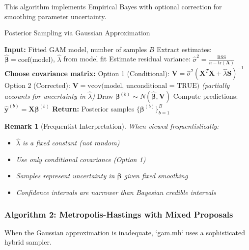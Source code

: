 \documentclass[12pt]{article}
\newtheorem{remark}{Remark}
\begin{document}
This algorithm implements Empirical Bayes with optional correction for smoothing parameter uncertainty.

\begin{algorithm}[H]
\caption{Posterior Sampling via Gaussian Approximation}
\begin{algorithmic}[1]
\State \textbf{Input:} Fitted GAM model, number of samples $B$
\State Extract estimates: $\hat{\boldsymbol{\beta}} = \text{coef(model)}$, $\hat{\lambda}$ from model fit
\State Estimate residual variance: $\hat{\sigma}^2 = \frac{\text{RSS}}{n - \text{tr}(\mathbf{A})}$
\State \textbf{Choose covariance matrix:}
\State \quad Option 1 (Conditional): $\mathbf{V} = \hat{\sigma}^2(\mathbf{X}^T\mathbf{X} + \hat{\lambda}\mathbf{S})^{-1}$
\State \quad Option 2 (Corrected): $\mathbf{V} = \text{vcov(model, unconditional = TRUE)}$
\State \quad \quad \textit{(partially accounts for uncertainty in $\hat{\lambda}$)}
    \State Draw $\boldsymbol{\beta}^{(b)} \sim N(\hat{\boldsymbol{\beta}}, \mathbf{V})$
    \State Compute predictions: $\hat{\mathbf{y}}^{(b)} = \mathbf{X}\boldsymbol{\beta}^{(b)}$
\EndFor
\State \textbf{Return:} Posterior samples $\{\boldsymbol{\beta}^{(b)}\}_{b=1}^B$
\end{algorithmic}
\end{algorithm}

\begin{remark}[Frequentist Interpretation]
When viewed frequentistically:
\begin{itemize}
    \item $\hat{\lambda}$ is a fixed constant (not random)
    \item Use only conditional covariance (Option 1)
    \item Samples represent uncertainty in $\boldsymbol{\beta}$ given fixed smoothing
    \item Confidence intervals are narrower than Bayesian credible intervals
\end{itemize}
\end{remark}

\subsubsection{Algorithm 2: Metropolis-Hastings with Mixed Proposals}

When the Gaussian approximation is inadequate, `gam.mh` uses a sophisticated hybrid sampler.
\end{document}
